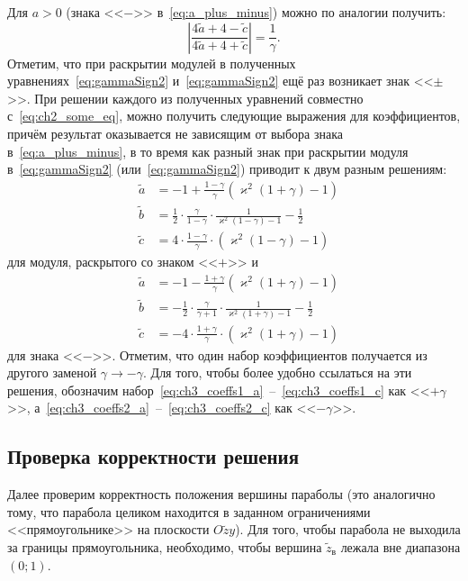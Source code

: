 \documentclass[a4paper, 12pt]{extarticle}
\def \vk {\varkappa}
\def \tz {\tilde{z}}
\def \ta {\tilde{a}}
\def \tc {\tilde{c}}
\def \tb {\tilde{b}}
\begin{document}
Для $a>0$ (знака <<$-$>> в~\eqref{eq:a_plus_minus}) можно по аналогии получить:
\begin{equation}
	\left| \frac{4\ta+4-\tc}{4\ta+4+\tc}  \right| = \frac{1}{\gamma}.\label{eq:gammaSign2}
\end{equation}
Отметим, что при раскрытии модулей в полученных уравнениях~\eqref{eq:gammaSign2} и~\eqref{eq:gammaSign2} ещё раз возникает знак <<$\pm$>>.
При решении каждого из полученных уравнений совместно с~\eqref{eq:ch2_some_eq}, можно получить следующие выражения для коэффициентов, причём результат оказывается не зависящим от выбора знака в~\eqref{eq:a_plus_minus}, в то время как разный знак при раскрытии модуля в~\eqref{eq:gammaSign2} (или~\eqref{eq:gammaSign2}) приводит к двум разным решениям:
\begin{eqnarray}\label{eq:ch3_coeffs1_a}
	&\ta &= -1 + \frac{1-\gamma}{\gamma}\left( \vk^2(1+\gamma) - 1 \right)\\
	\label{eq:ch3_coeffs1_b}
	&\tb &= \frac{1}{2}\cdot\frac{\gamma}{1 - \gamma}\cdot\frac{1}{\vk^2(1 - \gamma) -1 } - \frac{1}{2}\\
	\label{eq:ch3_coeffs1_c}
	&\tc &= 4\cdot\frac{1 - \gamma}{\gamma}\cdot\left(\vk^2(1 - \gamma) - 1 \right)
\end{eqnarray}
для модуля, раскрытого со знаком <<$+$>> и
\begin{eqnarray}\label{eq:ch3_coeffs2_a}
	&\ta &= -1 - \frac{1+\gamma}{\gamma}\left( \vk^2(1+\gamma) - 1 \right)\\
	\label{eq:ch3_coeffs2_b}
	&\tb &= -\frac{1}{2}\cdot\frac{\gamma}{\gamma + 1}\cdot\frac{1}{\vk^2(1 + \gamma) -1 } - \frac{1}{2}\\
	\label{eq:ch3_coeffs2_c}
	&\tc &= -4\cdot\frac{1 + \gamma}{\gamma}\cdot\left(\vk^2(1 +
	 \gamma) - 1 \right)
\end{eqnarray}
для знака <<$-$>>.
Отметим, что один набор коэффициентов получается из другого заменой  $\gamma \to -\gamma$.
Для того, чтобы более удобно ссылаться на эти решения, обозначим набор~\eqref{eq:ch3_coeffs1_a}~--~\eqref{eq:ch3_coeffs1_c} как <<$+\gamma$>>, а~\eqref{eq:ch3_coeffs2_a}~--~\eqref{eq:ch3_coeffs2_c} как <<$-\gamma$>>.

\subsection{Проверка корректности решения}
Далее проверим корректность положения вершины параболы (это аналогично тому, что парабола целиком находится в заданном ограничениями <<прямоугольнике>> на плоскости $O\tz y$).
Для того, чтобы парабола не выходила за границы прямоугольника, необходимо, чтобы вершина $\tz_\text{в}$ лежала вне диапазона $(0;1)$.
\end{document}
